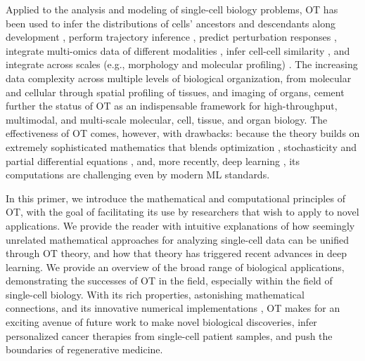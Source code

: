 Applied to the analysis and modeling of single-cell biology problems, OT has been used to infer the distributions of cells' ancestors and descendants along development \citep{schiebinger2019optimal}, perform trajectory inference \citep{bunne2022proximal, forrow2021lineageot, bunne2022recovering, lavenant2021towards, schiebinger2019optimal, tong2020trajectorynet, yang2020predicting, zhang2021optimal, chizat2022trajectory}, predict perturbation responses \citep{bunne2021learning, yang2018scalable, lubeck2022neural}, integrate multi-omics data of different modalities \citep{demetci2022scot}, infer cell-cell similarity \citep{huizing2022optimal}, and integrate across scales (e.g., morphology and molecular profiling) \citep{yang2021multi}. The increasing data complexity across multiple levels of biological organization, from molecular and cellular through spatial profiling \citep{moriel2021novosparc} of tissues, and imaging of organs, cement further the status of OT as an indispensable framework for high-throughput, multimodal, and multi-scale molecular, cell, tissue, and organ biology. The effectiveness of OT comes, however, with drawbacks: because the theory builds on extremely sophisticated mathematics that blends optimization \citep{cuturi2013sinkhorn, cuturi2022optimal}, stochasticity \citep{chizat2022trajectory, bunne2022recovering} and partial differential equations \citep{bunne2022proximal}, and, more recently, deep learning \citep{tong2020trajectorynet, bunne2021learning, bunne2022supervised, yang2018scalable, lubeck2022neural, yang2021multi}, its computations are challenging even by modern ML standards.


In this primer, we introduce the mathematical and computational principles of OT, with the goal of facilitating its use by researchers that wish to apply to novel applications. We provide the reader with intuitive explanations of how seemingly unrelated mathematical approaches for analyzing single-cell data can be unified through OT theory, and how that theory has triggered recent advances in deep learning. We provide an overview of the broad range of biological applications, demonstrating the successes of OT in the field, especially within the field of single-cell biology. With its rich properties, astonishing mathematical connections, and its innovative numerical implementations \citep{cuturi2022optimal}, OT makes for an exciting avenue of future work to make novel biological discoveries, infer personalized cancer therapies from single-cell patient samples, and push the boundaries of regenerative medicine.



